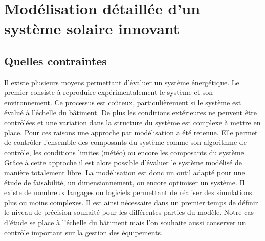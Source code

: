 \section{Modélisation détaillée d’un système solaire innovant} %
\label{sec:modelisation_detaillee_d_un_systeme_solaire_innovant}
\subsection{Quelles contraintes} %
\label{sub:quelles_contraintes}
Il existe plusieurs moyens permettant d’évaluer un système énergétique. Le premier
consiste à reproduire expérimentalement le système et son environnement. Ce processus est
coûteux, particulièrement si le système est évalué à l’échelle du bâtiment. De plus les
conditions extérieures ne peuvent être contrôlées et une variation dans la structure du
système est complexe à mettre en place. Pour ces raisons une approche par modélisation a
été retenue. Elle permet de contrôler l’ensemble des composants du système comme son
algorithme de contrôle, les conditions limites (météo) ou encore les composants du
système. Grâce à cette approche il est alors possible d’évaluer le système modélisé de
manière totalement libre. La modélisation est donc un outil adapté pour une
étude de faisabilité, un dimensionnement, ou encore optimiser un système. Il existe de
nombreux langages ou logiciels permettant de réaliser des simulations plus ou moins
complexes. Il est ainsi nécessaire dans un premier temps de définir le niveau de précision
souhaité pour les différentes parties du modèle. Notre cas d’étude se place à
l’échelle du bâtiment mais l’on souhaite aussi conserver un contrôle important sur la
gestion des équipements.

